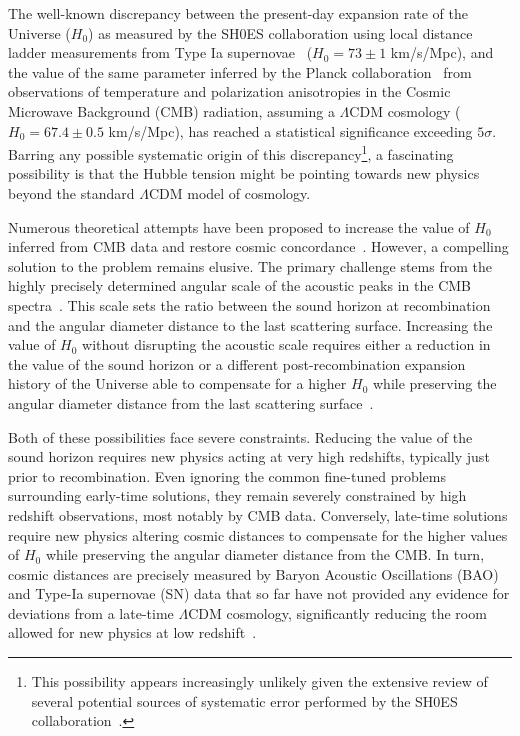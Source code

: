 \documentclass[superscriptaddress,twocolumn,showpacs,a4paper,
amssymb,amsmath,nobibnotes,aps,prl,
showkeys,
nofootinbib,notitlepage]{revtex4-1}
\begin{document}

The well-known discrepancy between the present-day expansion rate of the Universe ($H_0$) as measured by the SH0ES collaboration using local distance ladder measurements from Type Ia supernovae~\cite{Riess:2021jrx,Murakami:2023xuy,Breuval:2024lsv} ($H_0=73\pm1$ km/s/Mpc), and the value of the same parameter inferred by the Planck collaboration~\cite{Planck:2018vyg} from observations of temperature and polarization anisotropies in the Cosmic Microwave Background (CMB) radiation, assuming a $\Lambda$CDM cosmology ($H_0=67.4\pm0.5$ km/s/Mpc), has reached a statistical significance exceeding $5\sigma$. Barring any possible systematic origin of this discrepancy\footnote{This possibility appears increasingly unlikely given the extensive review of several potential sources of systematic error performed by the SH0ES collaboration~\cite{Riess:2021jrx,Riess:2024ohe,Brout:2023wol}.}, a fascinating possibility is that the Hubble tension might be pointing towards new physics beyond the standard $\Lambda$CDM model of cosmology.

Numerous theoretical attempts have been proposed to increase the value of $H_0$ inferred from CMB data and restore cosmic concordance~\cite{DiValentino:2021izs,Abdalla:2022yfr,Khalife:2023qbu,Schoneberg:2021qvd}. However, a compelling solution to the problem remains elusive. The primary challenge stems from the highly precisely determined angular scale of the acoustic peaks in the CMB spectra~\cite{Planck:2018vyg}. This scale sets the ratio between the sound horizon at recombination and the angular diameter distance to the last scattering surface. Increasing the value of $H_0$ without disrupting the acoustic scale requires either a reduction in the value of the sound horizon or a different post-recombination expansion history of the Universe able to compensate for a higher $H_0$ while preserving the angular diameter distance from the last scattering surface~\cite{Knox:2019rjx}.

Both of these possibilities face severe constraints. Reducing the value of the sound horizon requires new physics acting at very high redshifts, typically just prior to recombination. Even ignoring the common fine-tuned problems surrounding early-time solutions, they remain severely constrained by high redshift observations, most notably by CMB data. Conversely, late-time solutions require new physics altering cosmic distances to compensate for the higher values of $H_0$ while preserving the angular diameter distance from the CMB. In turn, cosmic distances are precisely measured by Baryon Acoustic Oscillations (BAO) and Type-Ia supernovae (SN) data that so far have not provided any evidence for deviations from a late-time $\Lambda$CDM cosmology, significantly reducing the room allowed for new physics at low redshift~\cite{Efstathiou:2021ocp,Keeley:2022ojz}.
\end{document}
